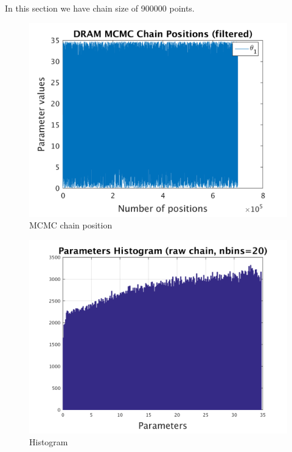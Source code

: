 In this section we have chain size of 900000 points. 

\begin{figure}[h!]
  
  \centering
   \includegraphics[scale=0.75]{output_900000/simple_ip_chain_pos_filt}
   \caption{MCMC chain position }
\end{figure}


\begin{figure}[h!]
  
  \centering
   \includegraphics[scale=0.75]{output_900000/simple_ip_hist_raw}
   \caption{Histogram}
\end{figure}



